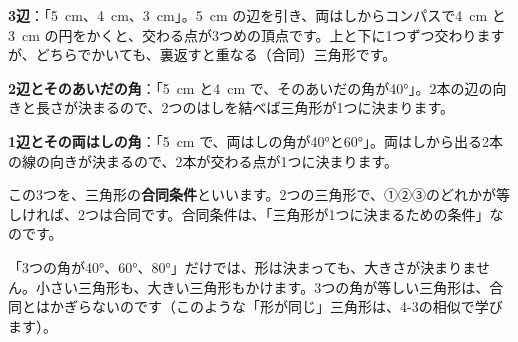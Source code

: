 \begin{enumerate}[label={\bkcircled[bkDeep]{\arabic*}}, leftmargin=2.4\zw, itemsep=2pt, topsep=2pt]
\item \textbf{3辺}：「\qty{5}{cm}、\qty{4}{cm}、\qty{3}{cm}」。\qty{5}{cm} の辺を引き、両はしからコンパスで\qty{4}{cm} と\qty{3}{cm} の円をかくと、交わる点が3つめの頂点です。上と下に1つずつ交わりますが、どちらでかいても、裏返すと重なる（合同）三角形です。
\item \textbf{2辺とそのあいだの角}：「\qty{5}{cm} と\qty{4}{cm} で、そのあいだの角が40°」。2本の辺の向きと長さが決まるので、2つのはしを結べば三角形が1つに決まります。
\item \textbf{1辺とその両はしの角}：「\qty{5}{cm} で、両はしの角が40°と60°」。両はしから出る2本の線の向きが決まるので、2本が交わる点が1つに決まります。
\end{enumerate}

この3つを、三角形の\textbf{合同条件}といいます。2つの三角形で、①②③のどれかが等しければ、2つは合同です。合同条件は、「三角形が1つに決まるための条件」なのです。

\par\addvspace{4pt}\noindent\begin{minipage}[c]{0.4\linewidth}\centering
{}
\end{minipage}\hfill
\begin{minipage}[c]{0.57\linewidth}
「3つの角が40°、60°、80°」だけでは、形は決まっても、大きさが決まりません。小さい三角形も、大きい三角形もかけます。3つの角が等しい三角形は、合同とはかぎらないのです（このような「形が同じ」三角形は、4-3の相似で学びます）。
\end{minipage}

